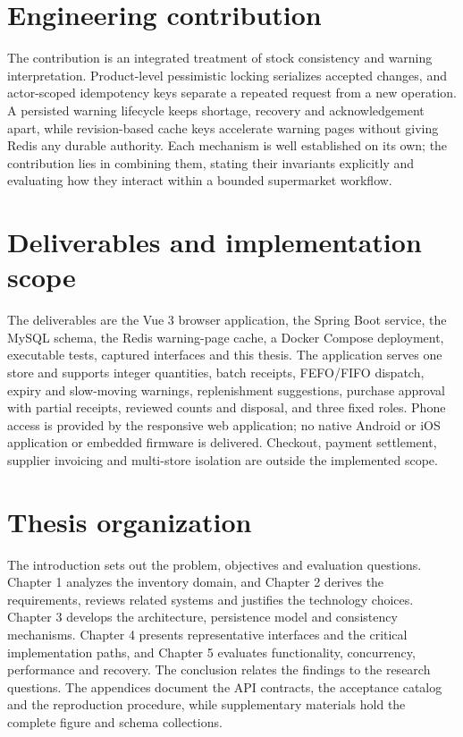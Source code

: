\documentclass[12pt,a4paper,oneside]{report}
\begin{document}
\FloatBarrier

\section*{Engineering contribution}


The contribution is an integrated treatment of stock consistency and warning interpretation. Product-level pessimistic locking serializes accepted changes, and actor-scoped idempotency keys separate a repeated request from a new operation. A persisted warning lifecycle keeps shortage, recovery and acknowledgement apart, while revision-based cache keys accelerate warning pages without giving Redis any durable authority. Each mechanism is well established on its own; the contribution lies in combining them, stating their invariants explicitly and evaluating how they interact within a bounded supermarket workflow.


\FloatBarrier

\section*{Deliverables and implementation scope}


The deliverables are the Vue 3 browser application, the Spring Boot service, the MySQL schema, the Redis warning-page cache, a Docker Compose deployment, executable tests, captured interfaces and this thesis. The application serves one store and supports integer quantities, batch receipts, FEFO/FIFO dispatch, expiry and slow-moving warnings, replenishment suggestions, purchase approval with partial receipts, reviewed counts and disposal, and three fixed roles. Phone access is provided by the responsive web application; no native Android or iOS application or embedded firmware is delivered. Checkout, payment settlement, supplier invoicing and multi-store isolation are outside the implemented scope.


\FloatBarrier

\section*{Thesis organization}


The introduction sets out the problem, objectives and evaluation questions. Chapter 1 analyzes the inventory domain, and Chapter 2 derives the requirements, reviews related systems and justifies the technology choices. Chapter 3 develops the architecture, persistence model and consistency mechanisms. Chapter 4 presents representative interfaces and the critical implementation paths, and Chapter 5 evaluates functionality, concurrency, performance and recovery. The conclusion relates the findings to the research questions. The appendices document the API contracts, the acceptance catalog and the reproduction procedure, while supplementary materials hold the complete figure and schema collections.
\end{document}
